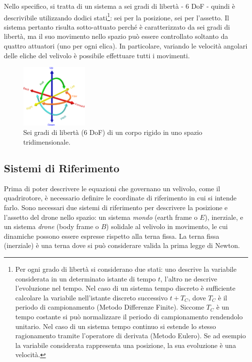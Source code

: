 Nello specifico, si tratta di un sistema a sei gradi di libertà - 6 \ac{DoF} - quindi è descrivibile utilizzando dodici stati\footnote{Per ogni grado di libertà si considerano due stati: uno descrive la variabile considerata in un determinato istante di tempo $t$, l'altro ne descrive l'evoluzione nel tempo. Nel caso di un sistema tempo discreto è sufficiente calcolare la variabile nell'istante discreto successivo $t + T_C$, dove $T_C$ è il periodo di campionamento (Metodo Differenze Finite). Siccome $T_C$ è un tempo costante si può normalizzare il periodo di campionamento rendendolo unitario. Nel caso di un sistema tempo continuo si estende lo stesso ragionamento tramite l'operatore di derivata (Metodo Eulero). Se ad esempio la variabile considerata rappresenta una posizione, la sua evoluzione è una velocità.}: sei per la posizione, sei per l'assetto. Il sistema pertanto risulta sotto-attuato perché è caratterizzato da sei gradi di libertà, ma il suo movimento nello spazio può essere controllato soltanto da quattro attuatori (uno per ogni elica). In particolare, variando le velocità angolari delle eliche del velivolo è possibile effettuare tutti i movimenti.

\begin{figure}[H]
    \centering
    \includegraphics[width=0.3\textwidth]{gfx/6dof}
    \caption[Sei gradi di libertà (6 \acs{DoF}) di un corpo rigido in uno spazio tridimensionale.]{Sei gradi di libertà (6 \acs{DoF}) di un corpo rigido in uno spazio tridimensionale.}
\end{figure}

\subsection{Sistemi di Riferimento}

Prima di poter descrivere le equazioni che governano un velivolo, come il quadrirotore, è necessario definire le coordinate di riferimento in cui si intende farlo. Sono necessari due sistemi di riferimento per descrivere la posizione e l'assetto del drone nello spazio: un sistema \emph{mondo} (earth frame o $E$), inerziale, e un sistema \emph{drone} (body frame o $B$) solidale al velivolo in movimento, le cui dinamiche possono essere espresse rispetto alla terna fissa. La terna fissa (inerziale) è una terna dove si può considerare valida la prima legge di Newton.\\

